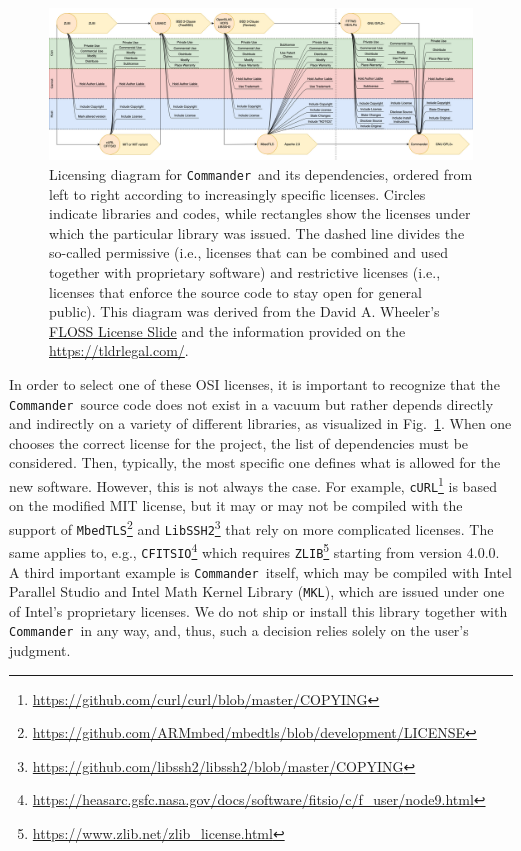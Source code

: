 \documentclass[twocolumn]{aa}
\def\commander{\texttt{Commander}}
\begin{document}
\begin{figure}[t]
    \center
    \includegraphics[width=\linewidth]{figures/Commander_Licenses_Diagram_v5.png}
    \caption{Licensing diagram
      for \commander\ and its dependencies,
      ordered from left to right according to increasingly specific
      licenses. Circles indicate libraries and codes, while rectangles
      show the licenses under which the particular library was
      issued. The dashed line divides the so-called permissive (i.e.,
      licenses that can be combined and used together with proprietary
      software) and restrictive licenses (i.e., licenses that enforce
      the source code to stay open for general public). This diagram 
      was derived from the David A. Wheeler's 
      \href{https://dwheeler.com/essays/floss-license-slide.html}{FLOSS License Slide}
      and the information provided on the \url{https://tldrlegal.com/}.}%
    \label{fig:licensing_diagram}
\end{figure}

In order to select one of these OSI licenses, it is important to recognize that the \commander\ source code does not exist in a vacuum but rather depends directly and indirectly on a variety of different libraries, as visualized in Fig.~\ref{fig:licensing_diagram}. When one chooses the correct license for the project, the list of dependencies must be considered. Then, typically, the most specific one defines what is allowed for the new software. However, this is not always the case. For example, \texttt{cURL}\footnote{
  \url{https://github.com/curl/curl/blob/master/COPYING}} is based on the modified MIT license, but it may or may not be compiled with the support of \texttt{MbedTLS}\footnote{
  \url{https://github.com/ARMmbed/mbedtls/blob/development/LICENSE}}
and \texttt{LibSSH2}\footnote{
  \url{https://github.com/libssh2/libssh2/blob/master/COPYING}} that
rely on more complicated licenses. The same applies to, e.g.,
\texttt{CFITSIO}\footnote{\url{https://heasarc.gsfc.nasa.gov/docs/software/fitsio/c/f_user/node9.html}} which requires \texttt{ZLIB}\footnote{\url{https://www.zlib.net/zlib_license.html}} starting from version 4.0.0. A third important example is \commander\ itself, which may be compiled with Intel Parallel Studio and Intel Math Kernel Library (\texttt{MKL}), which are issued under one of Intel's proprietary licenses. We do not ship or install this library together with \commander\ in any way, and, thus, such a decision relies solely on the user's judgment.
\end{document}
